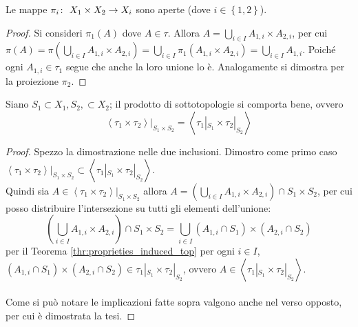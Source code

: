 \begin{theorem}
	Le mappe $\pi_i \colon\ X_1\times X_2 \rightarrow X_i$ sono aperte (dove $i \in \left\{1,2\right\}$). 
\end{theorem}
\begin{proof}
	Si consideri $\pi_1(A)$ dove $A \in \tau$. Allora $A = \bigcup_{i \in I} A_{1,i} \times A_{2,i}$, per cui $\pi(A) = \pi(\bigcup_{i \in I} A_{1,i} \times A_{2,i}) = \bigcup_{i\in I} \pi_1 (A_{1,i} \times A_{2,i}) = \bigcup_{i \in I} A_{1,i}$. Poiché ogni $A_{1,i} \in \tau_1$ segue che anche la loro unione lo è. Analogamente si dimostra per la proiezione $\pi_2$.
\end{proof}

\begin{theorem}
	Siano $S_1 \subset X_1, S_2, \subset X_2$; il prodotto di sottotopologie si comporta bene, ovvero
	\begin{equation*}
		\left\langle \tau_1 \times \tau_2 \right\rangle|_{S_1 \times S_2} = \left\langle \tau_1|_{S_1} \times \tau_2|_{S_2} \right\rangle 
	\end{equation*}
\end{theorem}
\begin{proof}
	Spezzo la dimostrazione nelle due inclusioni. Dimostro come primo caso $	\left\langle \tau_1 \times \tau_2 \right\rangle|_{S_1 \times S_2} \subset \left\langle \tau_1|_{S_1} \times \tau_2|_{S_2} \right\rangle$. \\ Quindi sia $A \in \left\langle \tau_1 \times \tau_2 \right\rangle|_{S_1 \times S_2}$ allora $A = \left( \bigcup_{i \in I} A_{1,i} \times A_{2,i} \right) \cap S_1 \times S_2$, per cui posso distribuire l'intersezione su tutti gli elementi dell'unione:
	\begin{equation*}
		\left( \bigcup_{i \in I} A_{1,i} \times A_{2,i} \right) \cap S_1 \times S_2 = \bigcup_{i \in I} (A_{1,i} \cap S_1) \times (A_{2,i} \cap S_2)
	\end{equation*}
	per il Teorema \ref{thr:proprieties_induced_top} per ogni $i \in I$, $(A_{1,i} \cap S_1) \times (A_{2,i} \cap S_2) \in \tau_1|_{S_1} \times \tau_2|_{S_2}$, ovvero $A \in \left\langle \tau_1|_{S_1} \times \tau_2|_{S_2} \right\rangle$. \\ \\ Come si può notare le implicazioni fatte sopra valgono anche nel verso opposto, per cui è dimostrata la tesi.
\end{proof}


